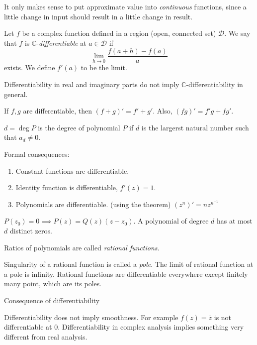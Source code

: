\begin{remark}
	It only makes sense to put approximate value into \textit{continuous} functions, since a little change in input should result in a little change in result.
	
\end{remark}

\begin{definition}
	Let $f$ be a complex function defined in a region (open, connected set) $\mathcal{D}$. We say that $f$ is $\mathbb{C}$-\textit{differentiable} at $a \in \mathcal{D}$ if \[
	\lim_{h \to 0} \frac{f(a+h)-f(a)}{a}
	\] 
	exists. We define $f'(a)$ to be the limit.
\end{definition}

\begin{remark}
	Differentiability in real and imaginary parts do not imply $\mathbb{C}$-differentiability in general.
\end{remark}

\begin{theorem}
	If $f, g$ are differentiable, then $(f+g)' = f' + g'$. Also, $(fg)' = f'g + fg'$.
\end{theorem}

\begin{definition}
	$d = \operatorname{deg} P$ is the degree of polynomial $P$ if $d$ is the largerst natural number such that $a_d \neq  0$.
\end{definition}

Formal consequences:
\begin{enumerate}
	\item Constant functions are differentiable.
	\item Identity function is differentiable, $f'(z) = 1$.
	\item Polynomials are differentiable. (using the theorem) $(z^n)' = n z^{n^{-1} }$
\end{enumerate}

\begin{theorem}
	$P(z_0) = 0 \implies P(z) = Q(z) (z-z_0)$. A polynomial of degree $d$ has at most $d$ distinct zeros.
\end{theorem}


\begin{definition}
	Ratios of polynomials are called \textit{rational functions}.
	
\end{definition}

Singularity of a rational function is called a  \textit{pole}. The limit of rational function at a pole is infinity. Rational functions are differentiable everywhere except finitely many point, which are its poles.

Consequence of differentiability

\begin{remark}
	Differentiability does not imply smoothness. For example $f(z) = \overline{z} $ is not differentiable at $0$. Differentiability in complex analysis implies something very different from real analysis.
\end{remark}
